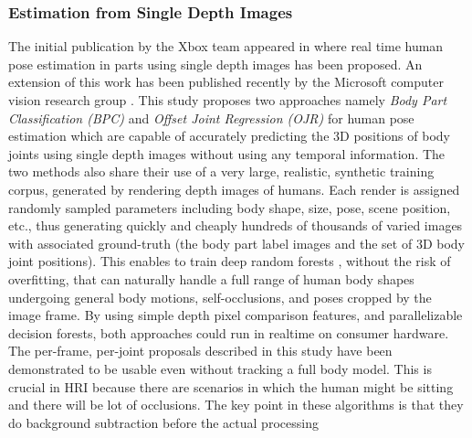\subsubsection{Estimation from Single Depth Images}
 The initial publication by the Xbox team \cite{Kinect2014} appeared in \cite{shotton2013real} where real time human pose estimation in parts using single depth images has been proposed. An extension of this work has been published recently by the Microsoft computer vision research group \cite{shotton2013efficient}. This study proposes two approaches namely \emph{Body Part Classification (BPC)} and \emph{Offset Joint Regression (OJR)} for human pose estimation which are capable of accurately predicting the 3D positions of body joints using single depth images without using any temporal information. The two methods also share their use of a very large, realistic, synthetic training corpus, generated by rendering depth images of humans. Each render is assigned randomly sampled parameters including body shape, size, pose, scene position, etc., thus generating quickly and cheaply hundreds of thousands of varied images with associated ground-truth (the body part label images and the set of 3D body joint positions). This enables to train deep random forests \cite{breiman2001random}, without the risk of overfitting, that can naturally handle a full range of human body shapes undergoing general body motions, self-occlusions, and poses cropped by the image frame. By using simple depth pixel comparison features, and parallelizable decision forests, both approaches could run in realtime on consumer hardware. The per-frame, per-joint proposals described in this study have been demonstrated to be usable even without tracking a full body model. This is crucial in HRI because there are scenarios in which the human might be sitting and there will be lot of occlusions. The key point in these algorithms is that they do background subtraction before the actual processing 
